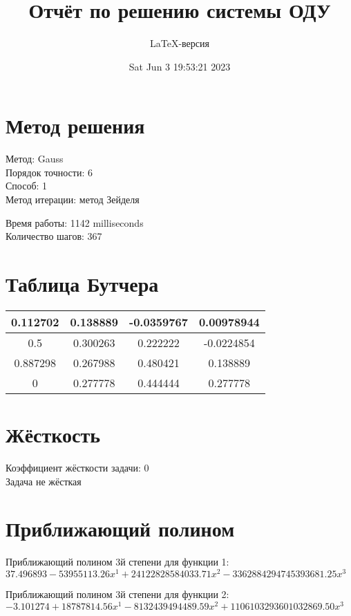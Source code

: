 \documentclass[a4paper,14pt]{extarticle}
\title{Отчёт по решению системы ОДУ}
\author{LaTeX-версия}
\date{Sat Jun  3 19:53:21 2023}
\begin{document}
\maketitle

\tableofcontents
\pagebreak

\section{Метод решения}

Метод: Gauss\\
Порядок точности: 6\\
Способ: 1\\
Метод итерации: метод Зейделя

Время работы: 1142 milliseconds\\
Количество шагов: 367\\
\section{Таблица Бутчера}

\begin{table}[h]
\centering
\begin{tabular}{|c||c|c|c|}
\hline
0.112702 & 0.138889 & -0.0359767 & 0.00978944\\
\hline
0.5 & 0.300263 & 0.222222 & -0.0224854\\
\hline
0.887298 & 0.267988 & 0.480421 & 0.138889\\
\hline
0 & \cellcolor{lightgray} 0.277778 & \cellcolor{lightgray} 0.444444 & \cellcolor{lightgray} 0.277778\\
\hline
\end{tabular}
\end{table}

\section{Жёсткость}

Коэффициент жёсткости задачи: 0\\
Задача не жёсткая

\section{Приближающий полином}

Приближающий полином 3й степени для функции 1: $37.496893 - 53955113.26x^1 + 24122828584033.71x^2 - 3362884294745393681.25x^3$

Приближающий полином 3й степени для функции 2: $-3.101274 + 18787814.56x^1 - 8132439494489.59x^2 + 1106103293601032869.50x^3$
\end{document}
